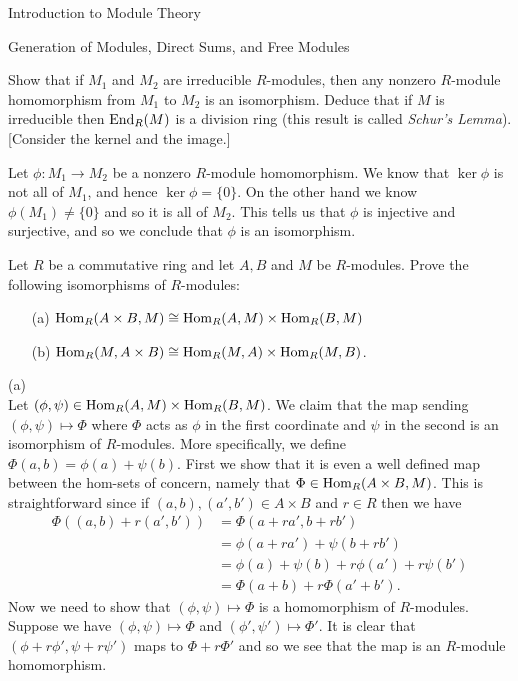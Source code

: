 \begin{chapter}{Introduction to Module Theory}
\begin{section}{Generation of Modules, Direct Sums, and Free Modules}
\begin{problem}\label{ex:10.3.11}
Show that if $M_1$ and $M_2$ are irreducible $R$-modules, then any nonzero $R$-module homomorphism from $M_1$ to $M_2$ is an isomorphism. Deduce that if $M$ is irreducible then $\operatorname{End}_R(M)$ is a division ring (this result is called \emph{Schur's Lemma}). [Consider the kernel and the image.]
\end{problem}
\begin{solution}
Let $\phi:M_1\to M_2$ be a nonzero $R$-module homomorphism. We know that $\ker\phi$ is not all of $M_1$, and hence $\ker\phi = \{0\}$. On the other hand we know $\phi(M_1) \neq \{0\}$ and so it is all of $M_2$. This tells us that $\phi$ is injective and surjective, and so we conclude that $\phi$ is an isomorphism.
\end{solution}\oneperpage



\begin{problem}\label{ex:10.3.12}
Let $R$ be a commutative ring and let $A,B$ and $M$ be $R$-modules. Prove the following isomorphisms of $R$-modules:\begin{enumerate}
\item[(a)] $\operatorname{Hom}_R(A\times B,M)\cong \operatorname{Hom}_R(A,M)\times \operatorname{Hom}_R(B,M)$
\item[(b)] $\operatorname{Hom}_R(M,A\times B)\cong \operatorname{Hom}_R(M,A)\times \operatorname{Hom}_R(M,B)$.
\end{enumerate}
\end{problem}
\begin{solution}
(a)\\
Let $(\phi,\psi)\in \operatorname{Hom}_R(A,M)\times \operatorname{Hom}_R(B,M)$. We claim that the map sending $(\phi,\psi)\mapsto \Phi$ where $\Phi$ acts as $\phi$ in the first coordinate and $\psi$ in the second is an isomorphism of $R$-modules. More specifically, we define $\Phi(a,b) = \phi(a) + \psi(b)$. First we show that it is even a well defined map between the hom-sets of concern, namely that $\Phi\in \operatorname{Hom}_R(A\times B,M)$. This is straightforward since if $(a,b),(a',b')\in A\times B$ and $r\in R$ then we have \begin{align*}
\Phi((a,b)+r(a',b')) &= \Phi(a+ra',b+rb') \\&= \phi(a+ra')+\psi(b+rb')\\& = \phi(a)+\psi(b) + r\phi(a') +r\psi(b') \\&= \Phi(a+b) + r\Phi(a'+b').
\end{align*}
Now we need to show that $(\phi,\psi)\mapsto \Phi$ is a homomorphism of $R$-modules. Suppose we have $(\phi,\psi)\mapsto \Phi$ and $(\phi',\psi')\mapsto \Phi'$. It is clear that $(\phi+r\phi', \psi+r\psi')$ maps to $\Phi + r\Phi'$ and so  we see that the map is an $R$-module homomorphism. 


\end{solution}
\end{section}
\end{chapter}
